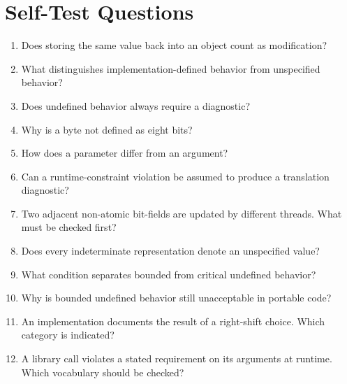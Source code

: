 \documentclass[10pt,letterpaper]{article}
\begin{document}
\section{Self-Test Questions}
\begin{enumerate}
  \item Does storing the same value back into an object count as modification?
  \item What distinguishes implementation-defined behavior from unspecified behavior?
  \item Does undefined behavior always require a diagnostic?
  \item Why is a byte not defined as eight bits?
  \item How does a parameter differ from an argument?
  \item Can a runtime-constraint violation be assumed to produce a translation diagnostic?
  \item Two adjacent non-atomic bit-fields are updated by different threads. What must be checked first?
  \item Does every indeterminate representation denote an unspecified value?
  \item What condition separates bounded from critical undefined behavior?
  \item Why is bounded undefined behavior still unacceptable in portable code?
  \item An implementation documents the result of a right-shift choice. Which category is indicated?
  \item A library call violates a stated requirement on its arguments at runtime. Which vocabulary should be checked?
\end{enumerate}

\clearpage
\end{document}

